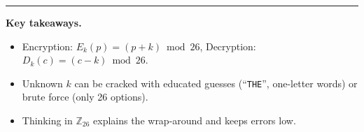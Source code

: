 \documentclass[12pt]{article}
\begin{document}
\bigskip
\hrule
\bigskip

\textbf{Key takeaways.}
\begin{itemize}[leftmargin=1.25em]
  \item Encryption: \(E_k(p)=(p+k)\bmod 26\), Decryption: \(D_k(c)=(c-k)\bmod 26\).
  \item Unknown \(k\) can be cracked with educated guesses (``\texttt{THE}'', one-letter words) or brute force (only 26 options).
  \item Thinking in \(\mathbb{Z}_{26}\) explains the wrap-around and keeps errors low.
\end{itemize}
\end{document}
